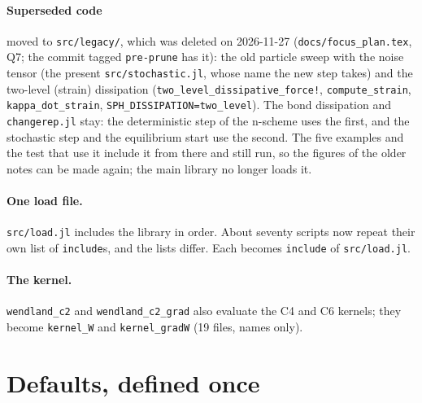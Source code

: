 \documentclass[11pt,aps,preprint,nofootinbib,superscriptaddress,tightenlines]{revtex4-2}
\newcommand{\file}[1]{\texttt{#1}}
\let\oldparagraph\paragraph
\renewcommand{\paragraph}{\par\bigskip\oldparagraph}
\begin{document}
\paragraph{Superseded code} moved to \file{src/legacy/}, which was deleted on 2026-11-27 (\file{docs/focus\_plan.tex}, Q7; the
commit tagged \file{pre-prune} has it): the old particle sweep with the
noise tensor (the present \file{src/stochastic.jl}, whose name the new step takes) and the
two-level (strain) dissipation (\file{two\_level\_dissipative\_force!}, \file{compute\_strain},
\file{kappa\_dot\_strain}, \file{SPH\_DISSIPATION=two\_level}).  The bond dissipation and
\file{changerep.jl} stay: the deterministic step of the n-scheme uses the first, and the
stochastic step and the equilibrium start use the second.  The five examples
and the test that use it include it from there and still run, so the figures of the older
notes can be made again; the main library no longer loads it.

\paragraph{One load file.}  \file{src/load.jl} includes the library in order.  About seventy
scripts now repeat their own list of \file{include}s, and the lists differ.  Each becomes
\file{include} of \file{src/load.jl}.

\paragraph{The kernel.}  \file{wendland\_c2} and \file{wendland\_c2\_grad} also evaluate the
C4 and C6 kernels; they become \file{kernel\_W} and \file{kernel\_gradW} (19 files, names only).

\section{Defaults, defined once}
\label{sec:defaults}
\end{document}
